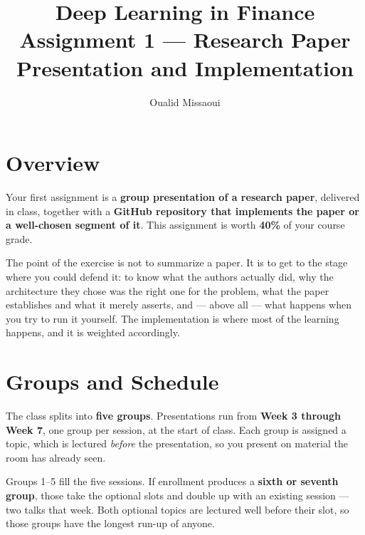 \documentclass[11pt]{article}
\title{\textbf{Deep Learning in Finance}\\[4pt]
       \large Assignment 1 --- Research Paper Presentation and Implementation}
\author{Oualid Missaoui}
\date{}
\begin{document}
\maketitle

\section*{Overview}

Your first assignment is a \textbf{group presentation of a research paper},
delivered in class, together with a \textbf{GitHub repository that implements
the paper or a well-chosen segment of it}. This assignment is worth
\textbf{40\%} of your course grade.

The point of the exercise is not to summarize a paper. It is to get to the stage
where you could defend it: to know what the authors actually did, why the
architecture they chose was the right one for the problem, what the paper
establishes and what it merely asserts, and --- above all --- what happens when
you try to run it yourself. The implementation is where most of the learning
happens, and it is weighted accordingly.

\section*{Groups and Schedule}

The class splits into \textbf{five groups}. Presentations run from
\textbf{Week 3 through Week 7}, one group per session, at the start of class.
Each group is assigned a topic, which is lectured \emph{before} the
presentation, so you present on material the room has already seen.

Groups 1--5 fill the five sessions. If enrollment produces a \textbf{sixth or
seventh group}, those take the optional slots and double up with an existing
session --- two talks that week. Both optional topics are lectured well before
their slot, so those groups have the longest run-up of anyone.
\end{document}
